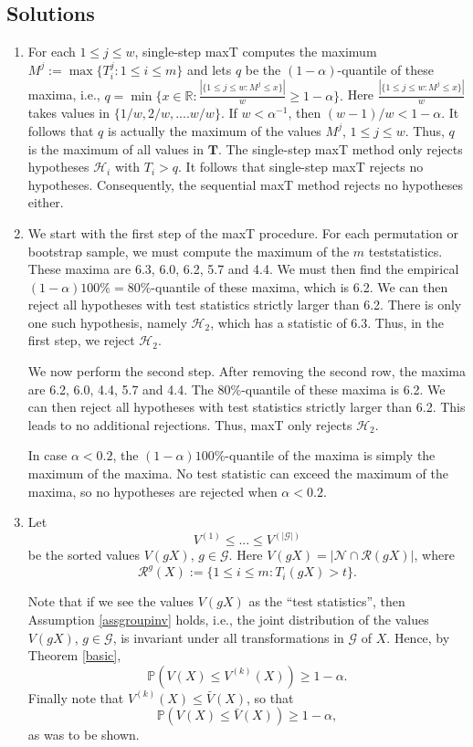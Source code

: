 \documentclass[11pt]{article}
\theoremstyle{plain}
\theoremstyle{definition}
\newcommand{\reals}{\mathbb{R}}
\newcommand{\N}{\mathcal{N}}
\newcommand{\R}{\mathcal{R}}
\newcommand{\G}{\mathcal{G}}
\newcommand{\Hy}{\mathcal{H}}
\newcommand{\pr}{\mathbb{P}}
\begin{document}
\begin{sols}

\subsection{Solutions}
\begin{enumerate}
\item  For each $1\leq j \leq w$, single-step  maxT computes the maximum $M^j:=\max\{T_i^j: 1\leq i \leq m\}$ and lets $q$ be the $(1-\alpha)$-quantile of these maxima, i.e., $q= \min\{x\in \reals: \frac{|\{1\leq j \leq w: M^j\leq x \}|}{w}\geq 1-\alpha  \}.$
Here $\frac{|\{1\leq j \leq w: M^j\leq x \}|}{w}$ takes values in $\{1/w, 2/w, .... w/w\}$. If $w<\alpha^{-1}$, then $(w-1)/w<1-\alpha$. It follows that $q$ is actually the maximum of the values $M^j$, $1\leq j \leq w$. Thus, $q$ is the maximum of all values in $\bm{T}$. The single-step maxT method only rejects hypotheses $\Hy_i$ with $T_i>q$. It follows that single-step maxT rejects no hypotheses. Consequently, the sequential maxT method rejects no hypotheses either.


\item We start with the first step of the maxT procedure. For each permutation or bootstrap sample, we must compute the maximum of the $m$ teststatistics. These maxima are 6.3, 6.0, 6.2, 5.7 and 4.4. We must then find the empirical $(1-\alpha)100\%=80\%$-quantile of these maxima, which is 6.2. We can then reject all hypotheses with test statistics strictly larger than 6.2. There is only one such hypothesis, namely $\Hy_2$, which has a statistic of 6.3. Thus, in the first step, we reject $\Hy_2$.

We now perform the second step. After removing the second row, the maxima are 6.2, 6.0, 4.4, 5.7 and 4.4. The $80\%$-quantile of these maxima is 6.2. We can then reject all hypotheses with test statistics strictly larger than 6.2. This leads to no additional rejections. Thus, maxT only rejects $\Hy_2$. 

In case $\alpha<0.2$, the  $(1-\alpha)100\%$-quantile of the maxima is simply the maximum of the maxima. No test statistic can exceed the maximum of the maxima, so no hypotheses are rejected when $\alpha<0.2$.

\item
Let
$$V^{(1)}\leq ...\leq V^{(|\G|)}$$ be the sorted values $V(gX)$, $g\in \G$. Here $V(gX)= |\N\cap\R(gX)|$, where 
$$ \R^g(X):=\{1\leq i \leq m: T_i(gX)>t\}.$$

Note that if we see the values $V(gX)$ as the ``test statistics'', then Assumption \ref{assgroupinv} holds, i.e., the joint distribution of the 
values $V(gX)$, $g\in \G$, is invariant under all transformations in $\G$ of $X$. Hence, by Theorem \ref{basic}, 
$$\pr(V(X)\leq V^{(k)}(X))\geq 1-\alpha.$$
Finally note that $V^{(k)}(X)\leq \bar{V}(X)$, so that 
$$\pr(V(X)\leq  \bar{V}(X))\geq 1-\alpha,$$
as was to be shown.

\end{enumerate}

\end{sols}
\end{document}
